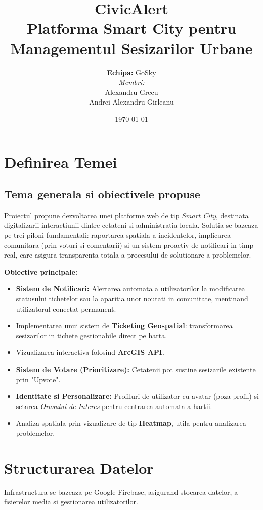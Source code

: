 \documentclass[12pt, a4paper]{article}
\title{\textbf{CivicAlert}\\
\large Platforma Smart City pentru Managementul Sesizarilor Urbane}
\author{
    \textbf{Echipa:} GoSky \\
    \textit{Membri:} \\
    Alexandru Grecu \\
    Andrei-Alexandru Girleanu
}
\date{\today}
\begin{document}
\maketitle
\tableofcontents
\newpage

\section{Definirea Temei}

\subsection{Tema generala si obiectivele propuse}
Proiectul propune dezvoltarea unei platforme web de tip \textit{Smart City}, destinata digitalizarii interactiunii dintre cetateni si administratia locala. Solutia se bazeaza pe trei piloni fundamentali: raportarea spatiala a incidentelor, implicarea comunitara (prin voturi si comentarii) si un sistem proactiv de notificari in timp real, care asigura transparenta totala a procesului de solutionare a problemelor.

\textbf{Obiective principale:}
\begin{itemize}
    \item \textbf{Sistem de Notificari:} Alertarea automata a utilizatorilor la modificarea statusului tichetelor sau la aparitia unor noutati in comunitate, mentinand utilizatorul conectat permanent.
    \item Implementarea unui sistem de \textbf{Ticketing Geospatial}: transformarea sesizarilor in tichete gestionabile direct pe harta.
    \item Vizualizarea interactiva folosind \textbf{ArcGIS API}.
    \item \textbf{Sistem de Votare (Prioritizare):} Cetatenii pot sustine sesizarile existente prin "Upvote".
    \item \textbf{Identitate si Personalizare:} Profiluri de utilizator cu avatar (poza profil) si setarea \textit{Orasului de Interes} pentru centrarea automata a hartii.
    \item Analiza spatiala prin vizualizare de tip \textbf{Heatmap}, utila pentru analizarea problemelor.
\end{itemize}

\section{Structurarea Datelor}

Infrastructura se bazeaza pe Google Firebase, asigurand stocarea datelor, a fisierelor media si gestionarea utilizatorilor.
\end{document}
